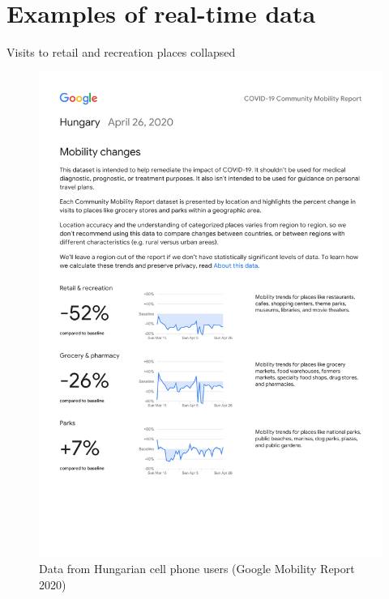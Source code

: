 \documentclass[
  ignorenonframetext,
  aspectratio=1610,
]{beamer}
\begin{document}
\hypertarget{examples-of-real-time-data}{%
\section{Examples of real-time data}\label{examples-of-real-time-data}}

\begin{frame}{Visits to retail and recreation places collapsed}
\protect\hypertarget{visits-to-retail-and-recreation-places-collapsed}{}
\begin{figure}
\centering
\includegraphics[width=1\textwidth,height=\textheight]{exhibit/fig/gmr-retail.pdf}
\caption{Data from Hungarian cell phone users (Google Mobility Report
2020)}
\end{figure}
\end{frame}
\end{document}
